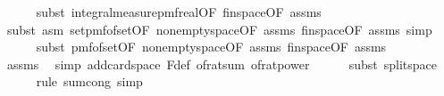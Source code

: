 \begin{isabellebody}
\ \ \ \ \isamarkupfalse%
\ {\isacharparenleft}{\kern0pt}subst\ integral{\isacharunderscore}{\kern0pt}measure{\isacharunderscore}{\kern0pt}pmf{\isacharunderscore}{\kern0pt}real{\isacharbrackleft}{\kern0pt}OF\ fin{\isacharunderscore}{\kern0pt}space{\isacharbrackleft}{\kern0pt}OF\ assms{\isacharparenleft}{\kern0pt}{}{\isacharparenright}{\kern0pt}{\isacharbrackright}{\kern0pt}{\isacharbrackright}{\kern0pt}{\isacharparenright}{\kern0pt}\isanewline
\ \ \ \ \ \isamarkupfalse%
\ {\isacharparenleft}{\kern0pt}subst\ {\isacharparenleft}{\kern0pt}asm{\isacharparenright}{\kern0pt}\ set{\isacharunderscore}{\kern0pt}pmf{\isacharunderscore}{\kern0pt}of{\isacharunderscore}{\kern0pt}set{\isacharbrackleft}{\kern0pt}OF\ non{\isacharunderscore}{\kern0pt}empty{\isacharunderscore}{\kern0pt}space{\isacharbrackleft}{\kern0pt}OF\ assms{\isacharparenleft}{\kern0pt}{}{\isacharparenright}{\kern0pt}{\isacharbrackright}{\kern0pt}\ fin{\isacharunderscore}{\kern0pt}space{\isacharbrackleft}{\kern0pt}OF\ assms{\isacharparenleft}{\kern0pt}{}{\isacharparenright}{\kern0pt}{\isacharbrackright}{\kern0pt}{\isacharbrackright}{\kern0pt}{\isacharcomma}{\kern0pt}\ simp{\isacharparenright}{\kern0pt}\isanewline
\ \ \ \ \isamarkupfalse%
\ {\isacharparenleft}{\kern0pt}subst\ pmf{\isacharunderscore}{\kern0pt}of{\isacharunderscore}{\kern0pt}set{\isacharbrackleft}{\kern0pt}OF\ non{\isacharunderscore}{\kern0pt}empty{\isacharunderscore}{\kern0pt}space{\isacharbrackleft}{\kern0pt}OF\ assms{\isacharparenleft}{\kern0pt}{}{\isacharparenright}{\kern0pt}{\isacharbrackright}{\kern0pt}\ fin{\isacharunderscore}{\kern0pt}space{\isacharbrackleft}{\kern0pt}OF\ assms{\isacharparenleft}{\kern0pt}{}{\isacharparenright}{\kern0pt}{\isacharbrackright}{\kern0pt}{\isacharbrackright}{\kern0pt}{\isacharparenright}{\kern0pt}\isanewline
\ \ \ \ \isamarkupfalse%
\ assms{\isacharparenleft}{\kern0pt}{}{\isacharparenright}{\kern0pt}\ \isamarkupfalse%
\ {\isacharparenleft}{\kern0pt}simp\ add{\isacharcolon}{\kern0pt}card{\isacharunderscore}{\kern0pt}space\ F{\isacharunderscore}{\kern0pt}def\ of{\isacharunderscore}{\kern0pt}rat{\isacharunderscore}{\kern0pt}sum\ of{\isacharunderscore}{\kern0pt}rat{\isacharunderscore}{\kern0pt}power{\isacharparenright}{\kern0pt}\isanewline
\ \ \ \ \isamarkupfalse%
\ {\isacharparenleft}{\kern0pt}subst\ split{\isacharunderscore}{\kern0pt}space{\isacharparenright}{\kern0pt}\isanewline
\ \ \ \ \isamarkupfalse%
\ {\isacharparenleft}{\kern0pt}rule\ sum{\isachardot}{\kern0pt}cong{\isacharcomma}{\kern0pt}\ simp{\isacharparenright}{\kern0pt}\isanewline

\end{isabellebody}
